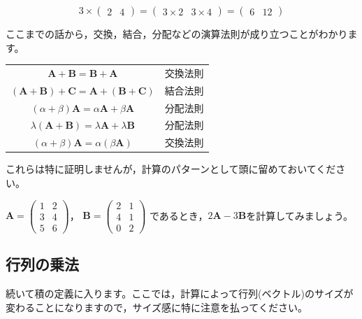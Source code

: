 \documentclass{ltjsbook}
\begin{document}
\begin{equation*}
    3 \times
    \begin{pmatrix}
        2 & 4
    \end{pmatrix}
    =
    \begin{pmatrix}
        3 \times 2 & 3 \times 4
    \end{pmatrix}
    =
    \begin{pmatrix}
        6 & 12
    \end{pmatrix}
\end{equation*}

ここまでの話から，交換，結合，分配などの演算法則が成り立つことがわかります。

\begin{center}
    \begin{tabular}{cr}
        $\bm{A} + \bm{B}  = \bm{B} + \bm{A}$                     & 交換法則 \\
        $(\bm{A} + \bm{B})+\bm{C}  = \bm{A} + (\bm{B}+\bm{C})$   & 結合法則 \\
        $(\alpha + \beta)\bm{A} = \alpha\bm{A} + \beta\bm{A}$    & 分配法則 \\
        $\lambda(\bm{A}+\bm{B}) = \lambda\bm{A} + \lambda\bm{B}$ & 分配法則 \\
        $(\alpha + \beta )\bm{A}  = \alpha(\beta\bm{A})$         & 交換法則 \\
    \end{tabular}
\end{center}

これらは特に証明しませんが，計算のパターンとして頭に留めておいてください。

\begin{reidai}{}{}

    $\bm{A} = \begin{pmatrix} 1 & 2 \\ 3 & 4 \\ 5 & 6\end{pmatrix}$，
    $\bm{B} = \begin{pmatrix} 2 & 1 \\ 4 & 1 \\ 0 & 2\end{pmatrix}$
    であるとき，$2\bm{A} -3 \bm{B}$を計算してみましょう。

\end{reidai}

\subsection{行列の乗法}
続いて積の定義に入ります。ここでは，計算によって行列(ベクトル)のサイズが変わることになりますので，サイズ感に特に注意を払ってください。
\end{document}

